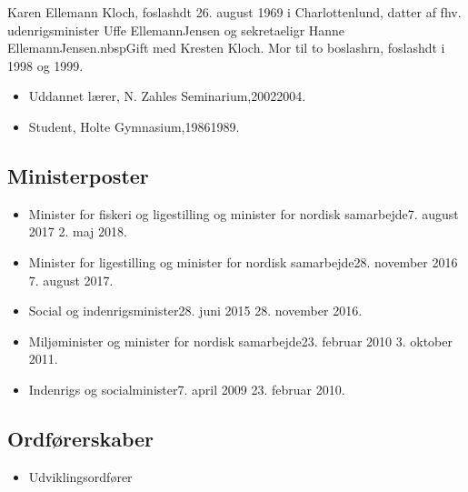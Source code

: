 \documentclass[11pt, a4paper]{awesome-cv}
\begin{document}
\makecvheader[R]
\makelettertitle
\begin{cvletter}
Karen Ellemann Kloch, foslashdt 26. august 1969 i Charlottenlund, datter af fhv. udenrigsminister Uffe EllemannJensen og sekretaeligr Hanne EllemannJensen.nbspGift med Kresten Kloch. Mor til to boslashrn, foslashdt i 1998 og 1999.

\begin{itemize}
\item Uddannet lærer, N. Zahles Seminarium,20022004.
\item Student, Holte Gymnasium,19861989.
\end{itemize}
\subsection*{Ministerposter}
\begin{itemize}
\item Minister for fiskeri og ligestilling og minister for nordisk samarbejde7. august 2017  2. maj 2018.
\item Minister for ligestilling og minister for nordisk samarbejde28. november 2016  7. august 2017.
\item Social og indenrigsminister28. juni 2015  28. november 2016.
\item Miljøminister og minister for nordisk samarbejde23. februar 2010  3. oktober 2011.
\item Indenrigs og socialminister7. april 2009  23. februar 2010.
\end{itemize}
\subsection*{Ordførerskaber}
\begin{itemize}
\item Udviklingsordfører
\end{itemize}

\end{cvletter}
\end{document}
